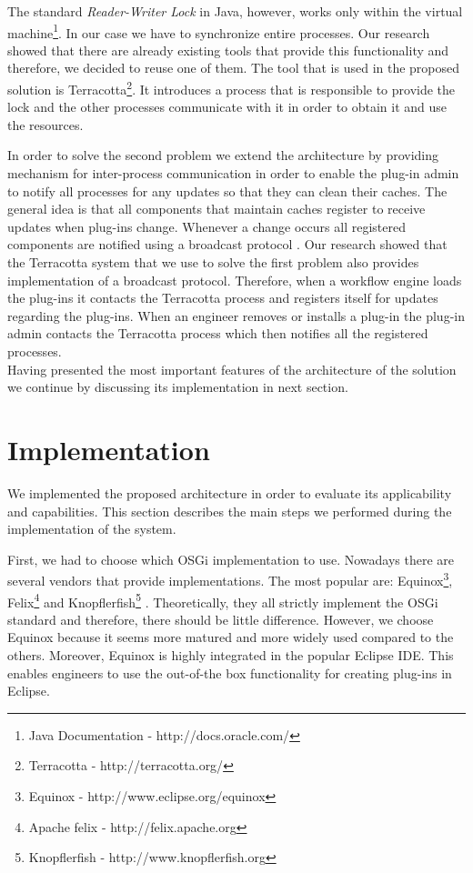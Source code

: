 The standard \textit{Reader-Writer Lock} in Java, however, works only within the virtual machine\footnote{Java Documentation - http://docs.oracle.com/}. In our case we have to synchronize entire processes. Our research showed that there are already existing tools that provide this functionality \cite{hernane2012dynamic} and therefore, we decided to reuse one of them. The tool that is used in the proposed solution is Terracotta\footnote{Terracotta - http://terracotta.org/}. It introduces a process that is responsible to provide the lock and the other processes communicate with it in order to obtain it and use the resources.

In order to solve the second problem we extend the architecture by providing mechanism for inter-process communication in order to enable the plug-in admin to notify all processes for any updates so that they can clean their caches. The general idea is that all components that maintain caches register to receive updates when plug-ins change. Whenever a change occurs all registered components are notified using a broadcast protocol \cite{joseph1988reliable}. Our research showed that the Terracotta system that we use to solve the first problem also provides implementation of a broadcast protocol. Therefore, when a workflow engine loads the plug-ins it contacts the Terracotta process and registers itself for updates regarding the plug-ins. When an engineer removes or installs a plug-in the plug-in admin contacts the Terracotta process which then notifies all the registered processes.\\

Having presented the most important features of the architecture of the solution we continue by discussing its implementation in next section. 


\section{Implementation}
\label{sec:implPlugin}

We implemented the proposed architecture in order to evaluate its applicability and capabilities. This section describes the main steps we performed during the implementation of the system.

First, we had to choose which OSGi implementation to use. Nowadays there are several vendors that provide implementations. The most popular are: Equinox\footnote{Equinox - http://www.eclipse.org/equinox}, Felix\footnote{Apache felix - http://felix.apache.org} and Knopflerfish\footnote{Knopflerfish - http://www.knopflerfish.org} \cite{tavares2008gentle}. Theoretically, they all strictly implement the OSGi standard and therefore, there should be little difference. However, we choose Equinox because it seems more matured and more widely used compared to the others. Moreover, Equinox is highly integrated in the popular Eclipse IDE. This enables engineers to use the out-of-the box functionality for creating plug-ins in Eclipse.

